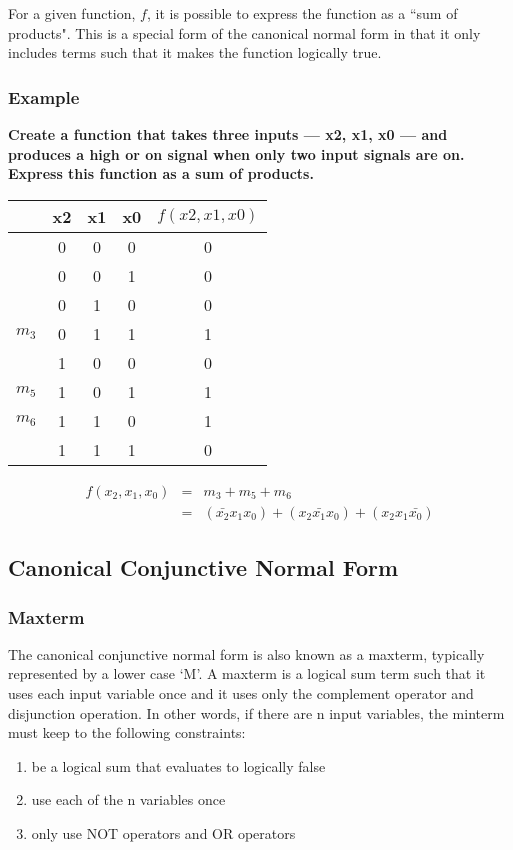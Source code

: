 \documentclass[11pt]{article}
\begin{document}
\noindent For a given function, \( f \), it is possible to express the function as a ``sum of products". This is a special form of the canonical normal form in that it only includes terms such that it makes the function logically true.

\subsubsection{Example}

\textbf{Create a function that takes three inputs --- x2, x1, x0 --- and produces a high or on signal when only two input signals are on. Express this function as a sum of products.}

\begin{table}[H]
	\centering
	\begin{tabular}{c c c c | c}
				&	x2	&	x1	&	x0	&	\( f(x2,x1,x0) \)\\
		\hline
					&	0	&	0	&	0	&	0\\
					&	0	&	0	&	1	&	0\\
					&	0	&	1	&	0	&	0\\
		\( m_3 \)	&	0	&	1	&	1	&	1\\
					&	1	&	0	&	0	&	0\\
		\( m_5 \)	&	1	&	0	&	1	&	1\\
		\( m_6 \)	&	1	&	1	&	0	&	1\\
					&	1	&	1	&	1	&	0
	\end{tabular}
\end{table}

\begin{eqnarray*}
	f(x_2,x_1,x_0) &=& m_3 + m_5 + m_6\\
		&=& (\bar{x_2} x_1 x_0) + (x_2 \bar{x_1} x_0) + (x_2 x_1 \bar{x_0})
\end{eqnarray*}

\subsection{Canonical Conjunctive Normal Form}

\subsubsection{Maxterm}

The canonical conjunctive normal form is also known as a maxterm, typically represented by a lower case `M'. A maxterm is a logical sum term such that it uses each input variable once and it uses only the complement operator and disjunction operation. In other words, if there are n input variables, the minterm must keep to the following constraints: 
\begin{enumerate}
	\item be a logical sum that evaluates to logically false
	\item use each of the n variables once
	\item only use NOT operators and OR operators
\end{enumerate}
\end{document}
